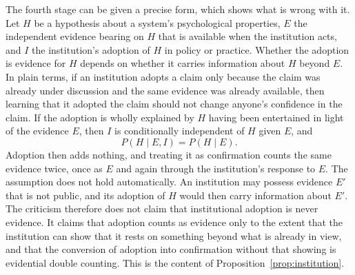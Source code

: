 \documentclass[12pt]{article}
\theoremstyle{definition}
\begin{document}
The fourth stage can be given a precise form, which shows what is wrong with it. Let $H$ be a hypothesis about a system's psychological properties, $E$ the independent evidence bearing on $H$ that is available when the institution acts, and $I$ the institution's adoption of $H$ in policy or practice. Whether the adoption is evidence for $H$ depends on whether it carries information about $H$ beyond $E$. In plain terms, if an institution adopts a claim only because the claim was already under discussion and the same evidence was already available, then learning that it adopted the claim should not change anyone's confidence in the claim. If the adoption is wholly explained by $H$ having been entertained in light of the evidence $E$, then $I$ is conditionally independent of $H$ given $E$, and
\begin{equation}
P(H\mid E, I) = P(H\mid E).
\end{equation}
Adoption then adds nothing, and treating it as confirmation counts the same evidence twice, once as $E$ and again through the institution's response to $E$. The assumption does not hold automatically. An institution may possess evidence $E'$ that is not public, and its adoption of $H$ would then carry information about $E'$. The criticism therefore does not claim that institutional adoption is never evidence. It claims that adoption counts as evidence only to the extent that the institution can show that it rests on something beyond what is already in view, and that the conversion of adoption into confirmation without that showing is evidential double counting. This is the content of Proposition~\ref{prop:institution}.
\end{document}
